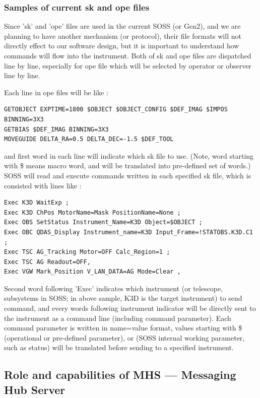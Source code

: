 \documentclass[a4paper,notitlepage]{article}
\begin{document}
\subsubsection{Samples of current sk and ope files}

Since 'sk' and 'ope' files are used in the current SOSS (or Gen2), and we are 
planning to have another mechanism (or protocol), their file formats will not 
directly effect to our software design, but it is important to understand 
how commands will flow into the instrument. 
Both of sk and ope files are dispatched line by line, especially for ope file 
which will be selected by operator or observer line by line. 

Each line in ope files will be like : 

\begin{verbatim}
GETOBJECT EXPTIME=1800 $OBJECT $OBJECT_CONFIG $DEF_IMAG $IMPOS BINNING=3X3
GETBIAS $DEF_IMAG BINNING=3X3
MOVEGUIDE DELTA_RA=0.5 DELTA_DEC=-1.5 $DEF_TOOL
\end{verbatim}

and first word in each line will indicate which sk file to use. (Note, word 
starting with \$ means macro word, and will be translated into pre-defined 
set of words.) 
SOSS will read and execute commands written in each specified sk file, 
which is consisted with lines like :

\begin{verbatim}
Exec K3D WaitExp ;
Exec K3D ChPos MotorName=Mask PositionName=None ;
Exec OBS SetStatus Instrument_Name=K3D Object=$OBJECT ;
Exec OBC QDAS_Display Instrument_name=K3D Input_Frame=!STATOBS.K3D.C1 ;
Exec TSC AG_Tracking Motor=OFF Calc_Region=1 ;
Exec TSC AG Readout=OFF,
Exec VGW Mark_Position V_LAN_DATA=AG Mode=Clear ,
\end{verbatim}

Second word following 'Exec' indicates which instrument (or telescope, 
subsystems in SOSS; in above sample, K3D is the target instrument) 
to send command, and every words following instrument 
indicator will be directly sent to the instrument as a command line 
(including command parameter). Each command parameter is written in name=value 
format, values starting with \$ (operational or pre-defined parameter), or \! 
(SOSS internal working parameter, such as status) will be translated before 
sending to a specified instrument. 

\subsection{Role and capabilities of MHS --- Messaging Hub Server}
\label{MHS_Role}
\end{document}
